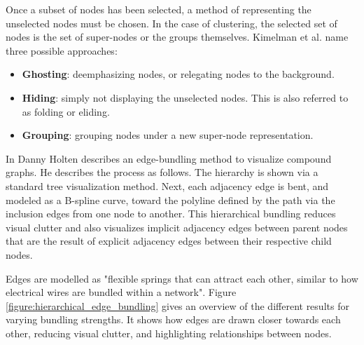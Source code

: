 Once a subset of nodes has been selected, a method of representing the unselected nodes must be chosen. In the case of clustering, the selected set of nodes is the set of super-nodes or the groups themselves. Kimelman et al. name three possible approaches\cite{herman:2000}:

\begin{itemize}
	\item \textbf{Ghosting}: deemphasizing nodes, or relegating nodes to the background.
	\item \textbf{Hiding}: simply not displaying the unselected nodes. This is also referred to as folding or eliding.
	\item \textbf{Grouping}: grouping nodes under a new super-node representation.
\end{itemize}

In \cite{Holten:2006:HEB:1187627.1187772} Danny Holten describes an edge-bundling method to visualize compound graphs. He describes the process as follows. The hierarchy is shown via a standard tree visualization method. Next, each adjacency edge is bent, and modeled as a B-spline curve, toward the polyline defined by the path via the inclusion edges from one node to another. This hierarchical bundling reduces visual clutter and also visualizes implicit adjacency edges between parent nodes that are the result of explicit adjacency edges between their respective child nodes.

Edges are modelled as "flexible springs that can attract each other, similar to how electrical wires are bundled within a network"\cite{holten:2009}. Figure \ref{figure:hierarchical_edge_bundling} gives an overview of the different results for varying bundling strengths. It shows how edges are drawn closer towards each other, reducing visual clutter, and highlighting relationships between nodes.


